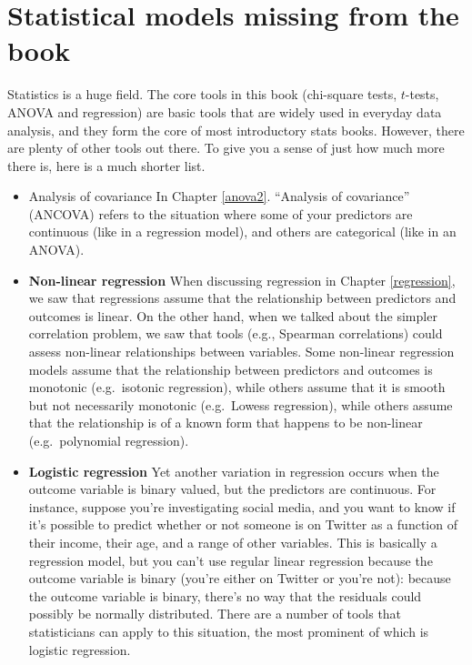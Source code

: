 \documentclass[
  11pt,
  a4paper,
  twoside,symmetric,openright]{book}
\theoremstyle{break}
\theoremstyle{break}
\begin{document}
\section*{Statistical models missing from the book}\label{statistical-models-missing-from-the-book}

Statistics is a huge field. The core tools in this book (chi-square tests, \(t\)-tests, ANOVA and regression) are basic tools that are widely used in everyday data analysis, and they form the core of most introductory stats books. However, there are plenty of other tools out there. To give you a sense of just how much more there is, here is a much shorter list.

\begin{itemize}
\item
  Analysis of covariance In Chapter \ref{anova2}. ``Analysis of covariance'' (ANCOVA) refers to the situation where some of your predictors are continuous (like in a regression model), and others are categorical (like in an ANOVA).
\item
  \textbf{Non-linear regression} When discussing regression in Chapter \ref{regression}, we saw that regressions assume that the relationship between predictors and outcomes is linear. On the other hand, when we talked about the simpler correlation problem, we saw that tools (e.g., Spearman correlations) could assess non-linear relationships between variables. Some non-linear regression models assume that the relationship between predictors and outcomes is monotonic (e.g.~isotonic regression), while others assume that it is smooth but not necessarily monotonic (e.g.~Lowess regression), while others assume that the relationship is of a known form that happens to be non-linear (e.g.~polynomial regression).
\item
  \textbf{Logistic regression} Yet another variation in regression occurs when the outcome variable is binary valued, but the predictors are continuous. For instance, suppose you're investigating social media, and you want to know if it's possible to predict whether or not someone is on Twitter as a function of their income, their age, and a range of other variables. This is basically a regression model, but you can't use regular linear regression because the outcome variable is binary (you're either on Twitter or you're not): because the outcome variable is binary, there's no way that the residuals could possibly be normally distributed. There are a number of tools that statisticians can apply to this situation, the most prominent of which is logistic regression.

\end{itemize}
\end{document}
